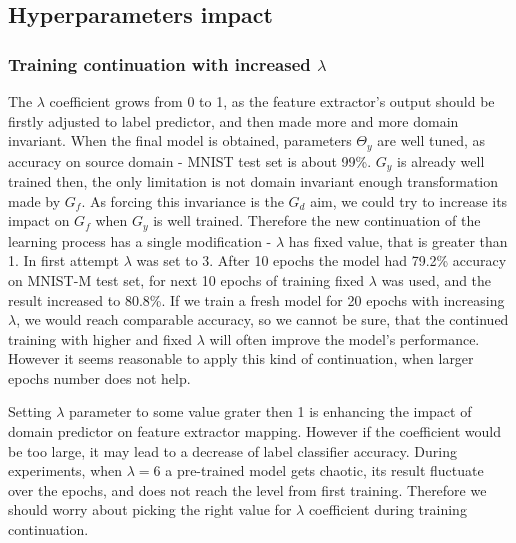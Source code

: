 \documentclass{article}
\begin{document}
\subsection{Hyperparameters impact}

\subsubsection{Training continuation with increased $\lambda$}
The $\lambda$ coefficient grows from 0 to 1, as the feature extractor's output should be firstly adjusted to label predictor, and then made more and more domain invariant. When the final model is obtained, parameters $\Theta_{y}$ are well tuned, as accuracy on source domain - MNIST test set is about 99\%. $G_{y}$ is already well trained then, the only limitation is not domain invariant enough transformation made by $G_{f}$. As forcing this invariance is the $G_{d}$ aim, we could try to increase its impact on $G_{f}$ when $G_{y}$ is well trained. Therefore the new continuation of the learning process has a single modification - $\lambda$ has fixed value, that is greater than 1. In first attempt $\lambda$ was set to 3. After 10 epochs the model had 79.2\% accuracy on MNIST-M test set, for next 10 epochs of training fixed $\lambda$ was used, and the result increased to 80.8\%. If we train a fresh model for 20 epochs with increasing $\lambda$, we would reach comparable accuracy, so we cannot be sure, that the continued training with higher and fixed $\lambda$ will often improve the model's performance. However it seems reasonable to apply this kind of continuation, when larger epochs number does not help.
\par
Setting $\lambda$ parameter to some value grater then 1 is enhancing the impact of domain predictor on feature extractor mapping. However if the coefficient would be too large, it may lead to a decrease of label classifier accuracy. During experiments, when $\lambda = 6$ a pre-trained model gets chaotic, its result fluctuate over the epochs, and does not reach the level from first training. Therefore we should worry about picking the right value for $\lambda$ coefficient during training continuation.
\end{document}

